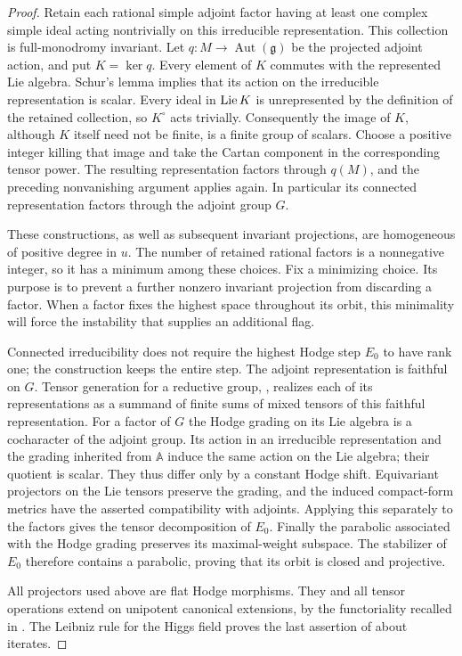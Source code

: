 \begin{proof}
Retain each rational simple adjoint factor having at least one
complex simple ideal acting nontrivially on this irreducible
representation.  This collection is full-monodromy invariant.
Let $q:M\to\operatorname{Aut}(\mathfrak g)$ be the projected
adjoint action, and put $K=\ker q$.  Every element of $K$
commutes with the represented Lie algebra.  Schur's lemma implies
that its action on the irreducible representation is scalar.
Every ideal in $\operatorname{Lie} K$ is unrepresented by the definition of the
retained collection, so $K^\circ$ acts trivially.  Consequently
the image of $K$, although $K$ itself need not be finite, is a
finite group of scalars.  Choose a positive integer killing that
image and take the Cartan component in the corresponding tensor
power.  The resulting representation factors through $q(M)$,
and the preceding nonvanishing argument applies again.  In
particular its connected representation factors through the
adjoint group $G$.

These constructions, as well as subsequent invariant projections,
are homogeneous of positive degree in $u$.  The number of retained
rational factors is a nonnegative integer, so it has a minimum
among these choices.  Fix a minimizing choice.  Its purpose is to
prevent a further nonzero invariant projection from discarding a
factor.  When a factor fixes the highest space throughout its orbit,
this minimality will force the instability that supplies an additional
flag.

Connected irreducibility does not require the highest Hodge step
$E_0$ to have rank one; the construction keeps the entire step.
The adjoint representation is faithful on $G$.  Tensor generation
for a reductive group, \cite[Theorem~4.14]{Milne}, realizes each
of its representations as a summand of finite sums of mixed
tensors of this faithful representation.  For a factor of $G$
the Hodge grading on its Lie algebra is a cocharacter of the
adjoint group.  Its action in an irreducible representation and
the grading inherited from $\mathbb A$ induce the same action on
the Lie algebra; their quotient is scalar.  They thus differ
only by a constant Hodge shift.  Equivariant projectors on the
Lie tensors preserve the grading, and the induced compact-form
metrics have the asserted compatibility with adjoints.  Applying
this separately to the factors gives the tensor decomposition of
$E_0$.  Finally the parabolic associated with the Hodge grading
preserves its maximal-weight subspace.  The stabilizer of $E_0$
therefore contains a parabolic, proving that its orbit is closed
and projective.

All projectors used above are flat Hodge morphisms.  They and all
tensor operations extend on unipotent canonical extensions, by
the functoriality recalled in .  The
Leibniz rule for the Higgs field proves the last assertion of
 about iterates.
\end{proof}


